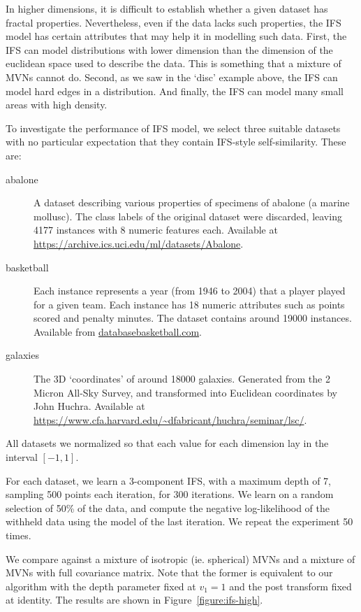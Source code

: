 In higher dimensions, it is difficult to establish whether a given dataset has fractal properties. Nevertheless, even if the data lacks such properties, the IFS model has certain attributes that may help it in modelling such data. First, the IFS can model distributions with lower dimension than the dimension of the euclidean space used to describe the data. This is something that a mixture of MVNs cannot do. Second, as we saw in the `disc' example above, the IFS can model hard edges in a distribution. And finally, the IFS can model many small areas with high density. 

To investigate the performance of IFS model, we select three suitable datasets with no particular expectation that they contain IFS-style self-similarity. These are: 
\begin{description}
\item[abalone \cite{nash1994population,lichman2013uci}] A dataset describing various properties of specimens of abalone (a marine mollusc). The class labels of the original dataset were discarded, leaving 4177 instances with 8 numeric features each. Available at \url{https://archive.ics.uci.edu/ml/datasets/Abalone}. 
\item[basketball] Each instance represents a year (from 1946 to 2004) that a player played for a given team. Each instance has 18 numeric attributes such as points scored and penalty minutes. The dataset contains around 19000 instances. Available from \url{databasebasketball.com}.
\item[galaxies] The 3D `coordinates' of around 18000 galaxies. Generated from the 2 Micron All-Sky Survey\cite{skrutskie2006two}, and transformed into Euclidean coordinates by John Huchra. Available at \url{https://www.cfa.harvard.edu/~dfabricant/huchra/seminar/lsc/}. 
\end{description}
All datasets we normalized so that each value for each dimension lay in the interval $[-1, 1]$. 

For each dataset, we learn a 3-component IFS, with a maximum depth of 7, sampling 500 points each iteration, for 300 iterations. We learn on a random selection of 50\% of the data, and compute the negative log-likelihood of the withheld data using the model of the last iteration. We repeat the experiment 50 times.

We compare against a mixture of isotropic (ie. spherical) MVNs and a mixture of MVNs with full covariance matrix. Note that the former is equivalent to our algorithm with the depth parameter fixed at $v_1 = 1$ and the post transform fixed at identity. The results are shown in Figure~\ref{figure:ifs-high}.

